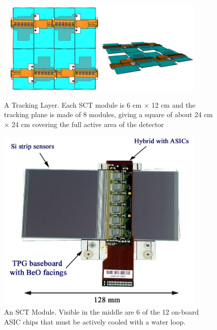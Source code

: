 \begin{figure}
\centering
\begin{minipage}[t]{.5\textwidth}
  \centering
  \captionsetup{width=0.8\textwidth}
    \includegraphics[width=0.9\textwidth]{ChapterFaser/Figs/Raster/TrackerLayer.jpg}  
    \caption[Tracking Layer]{A Tracking Layer. Each SCT module is 6 cm $\times$ 12 cm and the
    tracking plane is made of 8 modules, giving a square of about 24 cm $\times$  24 cm covering the full active area of the detector}
    \label{fig:TrackingLayer}
\end{minipage}%
\begin{minipage}[t]{.5\textwidth}
  \centering
  \captionsetup{width=0.8\textwidth}
    \includegraphics[width=0.9\textwidth]{ChapterFaser/Figs/Raster/SCT.jpg}  
    \caption[SCT Module]{An SCT Module. Visible in the middle are 6 of the 12 on-board ASIC chips that must be actively cooled with a water loop.}
    \label{fig:SCT}
\end{minipage}
\end{figure}

